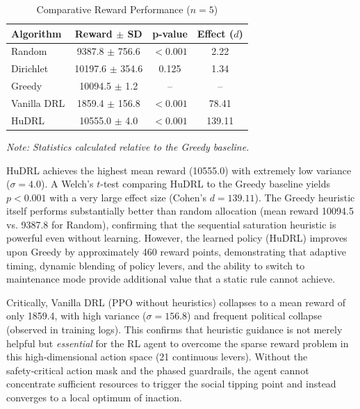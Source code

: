 \begin{table}[htbp]
\centering
\caption{Comparative Reward Performance ($n=5$)}
\label{tab:comparative_reward}
\begin{tabular}{l c c c}
\toprule
\textbf{Algorithm} & \textbf{Reward $\pm$ SD} & \textbf{p-value} & \textbf{Effect ($d$)} \\
\midrule
Random    & 9387.8 $\pm$ 756.6 & $< 0.001$ & 2.22 \\
Dirichlet & 10197.6 $\pm$ 354.6 & 0.125   & 1.34 \\
Greedy    & 10094.5 $\pm$ 1.2   & --      & -- \\
Vanilla DRL & 1859.4 $\pm$ 156.8 & $< 0.001$ & 78.41 \\
HuDRL     & 10555.0 $\pm$ 4.0   & $< 0.001$ & 139.11 \\
\bottomrule
\end{tabular}
\vspace{0.2cm}

\footnotesize
\textit{Note: Statistics calculated relative to the Greedy baseline.}
\end{table}

HuDRL achieves the highest mean reward (10555.0) with extremely low variance (\(\sigma = 4.0\)). A Welch’s \(t\)-test comparing HuDRL to the Greedy baseline yields \(p < 0.001\) with a very large effect size (Cohen’s \(d = 139.11\)). The Greedy heuristic itself performs substantially better than random allocation (mean reward 10094.5 vs. 9387.8 for Random), confirming that the sequential saturation heuristic is powerful even without learning. However, the learned policy (HuDRL) improves upon Greedy by approximately 460 reward points, demonstrating that adaptive timing, dynamic blending of policy levers, and the ability to switch to maintenance mode provide additional value that a static rule cannot achieve.

Critically, Vanilla DRL (PPO without heuristics) collapses to a mean reward of only 1859.4, with high variance (\(\sigma = 156.8\)) and frequent political collapse (observed in training logs). This confirms that heuristic guidance is not merely helpful but \textit{essential} for the RL agent to overcome the sparse reward problem in this high‑dimensional action space (21 continuous levers). Without the safety‑critical action mask and the phased guardrails, the agent cannot concentrate sufficient resources to trigger the social tipping point and instead converges to a local optimum of inaction.

